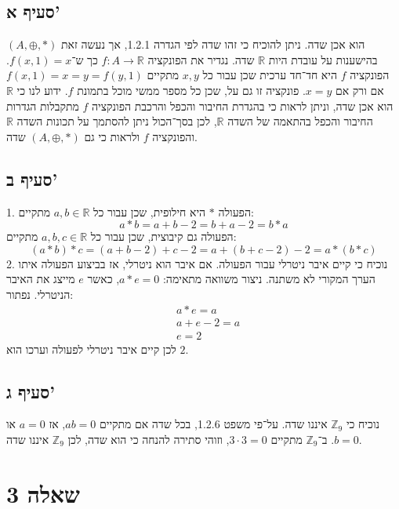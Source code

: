 \documentclass[a4paper, 10pt]{article}
\begin{document}
\begin{hebrew}
	\subsection{סעיף א'}
	$(A, \oplus, *)$ הוא אכן שדה.
	ניתן להוכיח כי זהו שדה לפי הגדרה 1.2.1,
	אך נעשה זאת בהישענות על עובדת היות $\mathbb{R}$ שדה.
	נגדיר את הפונקציה $f: A \to \mathbb{R}$
	כך ש־$f(x, 1) = x$.
	הפונקציה $f$ היא חד־חד ערכית שכן עבור כל $x, y$ מתקיים
	$f(x, 1) = x = y = f(y, 1)$ אם ורק אם $x = y$.
	פונקציה זו גם על, שכן כל מספר ממשי מוכל בתמונת $f$.
	ידוע לנו כי $\mathbb{R}$ הוא אכן שדה,
	וניתן לראות כי בהגדרת החיבור והכפל והרכבת הפונקציה $f$
	מתקבלות הגדרות החיבור והכפל בהתאמה של השדה $\mathbb{R}$,
	לכן בסך־הכול ניתן להסתמך על תכונות השדה $\mathbb{R}$
	והפונקציה $f$ ולראות כי גם $(A, \oplus, *)$ שדה.

	\subsection{סעיף ב'}
	1. הפעולה $*$ היא חילופית, שכן עבור כל $a, b \in \mathbb{R}$ מתקיים:
	\[
		a * b = a + b - 2 = b + a - 2 = b * a
	\]
	הפעולה גם קיבוצית, שכן עבור כל $a, b, c \in \mathbb{R}$ מתקיים:
	\[
		(a * b) * c = (a + b - 2) + c - 2 = a + (b + c - 2) - 2 = a * (b * c)
	\]
	2. נוכיח כי קיים איבר ניטרלי עבור הפעולה. אם איבר הוא ניטרלי,
	אז בביצוע הפעולה איתו הערך המקורי לא משתנה.
	ניצור משוואה מתאימה: $a * e = 0$, כאשר $e$ מייצג את האיבר הניטרלי.
	נפתור:
	\[
		\begin{aligned}
			& a * e = a \\
			& a + e - 2 = a \\
			& e = 2
		\end{aligned}
	\]
	לכן קיים איבר ניטרלי לפעולה וערכו הוא $2$.

	\subsection{סעיף ג'}
	נוכיח כי $\mathbb{Z}_9$ איננו שדה.
	על־פי משפט 1.2.6, בכל שדה אם מתקיים $ab = 0$,
	אז $a = 0$ או $b = 0$.
	ב־$\mathbb{Z}_9$ מתקיים $3 \cdot 3 = 0$,
	וזוהי סתירה להנחה כי הוא שדה,
	לכן $\mathbb{Z}_9$ איננו שדה.

	\section{שאלה 3}

\end{hebrew}
\end{document}
